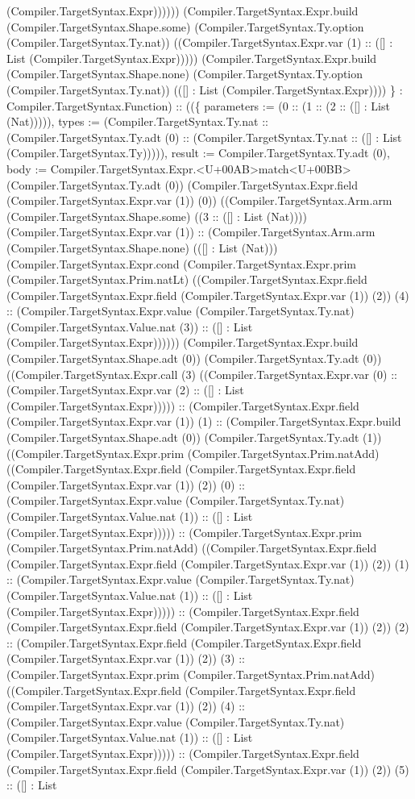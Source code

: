 \documentclass[11pt]{article}
\begin{document}
(Compiler.TargetSyntax.Expr)))))) (Compiler.TargetSyntax.Expr.build (Compiler.TargetSyntax.Shape.some) (Compiler.TargetSyntax.Ty.option (Compiler.TargetSyntax.Ty.nat)) ((Compiler.TargetSyntax.Expr.var (1) :: ([] : List (Compiler.TargetSyntax.Expr))))) (Compiler.TargetSyntax.Expr.build (Compiler.TargetSyntax.Shape.none) (Compiler.TargetSyntax.Ty.option (Compiler.TargetSyntax.Ty.nat)) (([] : List (Compiler.TargetSyntax.Expr)))) \} : Compiler.TargetSyntax.Function) :: ((\{ parameters := (0 :: (1 :: (2 :: ([] : List (Nat))))), types := (Compiler.TargetSyntax.Ty.nat :: (Compiler.TargetSyntax.Ty.adt (0) :: (Compiler.TargetSyntax.Ty.nat :: ([] : List (Compiler.TargetSyntax.Ty))))), result := Compiler.TargetSyntax.Ty.adt (0), body := Compiler.TargetSyntax.Expr.<U+00AB>match<U+00BB> (Compiler.TargetSyntax.Ty.adt (0)) (Compiler.TargetSyntax.Expr.field (Compiler.TargetSyntax.Expr.var (1)) (0)) ((Compiler.TargetSyntax.Arm.arm (Compiler.TargetSyntax.Shape.some) ((3 :: ([] : List (Nat)))) (Compiler.TargetSyntax.Expr.var (1)) :: (Compiler.TargetSyntax.Arm.arm (Compiler.TargetSyntax.Shape.none) (([] : List (Nat))) (Compiler.TargetSyntax.Expr.cond (Compiler.TargetSyntax.Expr.prim (Compiler.TargetSyntax.Prim.natLt) ((Compiler.TargetSyntax.Expr.field (Compiler.TargetSyntax.Expr.field (Compiler.TargetSyntax.Expr.var (1)) (2)) (4) :: (Compiler.TargetSyntax.Expr.value (Compiler.TargetSyntax.Ty.nat) (Compiler.TargetSyntax.Value.nat (3)) :: ([] : List (Compiler.TargetSyntax.Expr)))))) (Compiler.TargetSyntax.Expr.build (Compiler.TargetSyntax.Shape.adt (0)) (Compiler.TargetSyntax.Ty.adt (0)) ((Compiler.TargetSyntax.Expr.call (3) ((Compiler.TargetSyntax.Expr.var (0) :: (Compiler.TargetSyntax.Expr.var (2) :: ([] : List (Compiler.TargetSyntax.Expr))))) :: (Compiler.TargetSyntax.Expr.field (Compiler.TargetSyntax.Expr.var (1)) (1) :: (Compiler.TargetSyntax.Expr.build (Compiler.TargetSyntax.Shape.adt (0)) (Compiler.TargetSyntax.Ty.adt (1)) ((Compiler.TargetSyntax.Expr.prim (Compiler.TargetSyntax.Prim.natAdd) ((Compiler.TargetSyntax.Expr.field (Compiler.TargetSyntax.Expr.field (Compiler.TargetSyntax.Expr.var (1)) (2)) (0) :: (Compiler.TargetSyntax.Expr.value (Compiler.TargetSyntax.Ty.nat) (Compiler.TargetSyntax.Value.nat (1)) :: ([] : List (Compiler.TargetSyntax.Expr))))) :: (Compiler.TargetSyntax.Expr.prim (Compiler.TargetSyntax.Prim.natAdd) ((Compiler.TargetSyntax.Expr.field (Compiler.TargetSyntax.Expr.field (Compiler.TargetSyntax.Expr.var (1)) (2)) (1) :: (Compiler.TargetSyntax.Expr.value (Compiler.TargetSyntax.Ty.nat) (Compiler.TargetSyntax.Value.nat (1)) :: ([] : List (Compiler.TargetSyntax.Expr))))) :: (Compiler.TargetSyntax.Expr.field (Compiler.TargetSyntax.Expr.field (Compiler.TargetSyntax.Expr.var (1)) (2)) (2) :: (Compiler.TargetSyntax.Expr.field (Compiler.TargetSyntax.Expr.field (Compiler.TargetSyntax.Expr.var (1)) (2)) (3) :: (Compiler.TargetSyntax.Expr.prim (Compiler.TargetSyntax.Prim.natAdd) ((Compiler.TargetSyntax.Expr.field (Compiler.TargetSyntax.Expr.field (Compiler.TargetSyntax.Expr.var (1)) (2)) (4) :: (Compiler.TargetSyntax.Expr.value (Compiler.TargetSyntax.Ty.nat) (Compiler.TargetSyntax.Value.nat (1)) :: ([] : List (Compiler.TargetSyntax.Expr))))) :: (Compiler.TargetSyntax.Expr.field (Compiler.TargetSyntax.Expr.field (Compiler.TargetSyntax.Expr.var (1)) (2)) (5) :: ([] : List 
\end{document}
